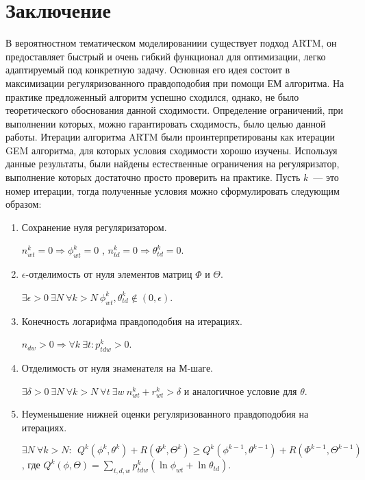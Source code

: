 \documentclass[12pt, twoside]{article}
\begin{document}
\section{Заключение}
	В вероятностном тематическом моделированиии существует подход ARTM, он предоставляет быстрый и очень гибкий функционал для оптимизации, легко адаптируемый под конкретную задачу. Основная его идея состоит в максимизации регуляризованного правдоподобия при помощи ЕМ алгоритма. На практике предложенный алгоритм успешно сходился, однако, не было теоретического обоснования данной сходимости. Определение ограничений, при выполнении которых, можно гарантировать сходимость, было целью данной работы. Итерации алгоритма ARTM были проинтерпретированы как итерации GEM алгоритма, для которых условия сходимости хорошо изучены. Используя данные результаты, были найдены естественные ограничения на регуляризатор, выполнение которых достаточно просто проверить на практике. Пусть $k$~--- это номер итерации, тогда полученные условия можно сформулировать следующим образом:
\begin{enumerate}
\item Сохранение нуля регуляризатором.
\smallskip

$ n^k_{wt} = 0 \Rightarrow \phi^k_{wt} = 0$ , $n^k_{td} = 0 \Rightarrow \theta^k_{td} = 0$.
\item $\epsilon$-отделимость от нуля элементов матриц $\Phi$ и $\Theta$.
\smallskip

$\exists \epsilon>0\ \exists N\ \forall k > N\ \phi^k_{wt}, \theta^k_{td} \notin (0, \epsilon)$. 
\item  Конечность логарифма правдоподобия на итерациях.
\smallskip

$ n_{dw}>0 \Rightarrow \forall k\ \exists t\colon p^k_{tdw} > 0$.
\item Отделимость от нуля знаменателя на М-шаге.
\smallskip

$\exists \delta >0\ \exists N\ \forall k > N \ \forall t\ \exists w\  n^k_{wt} + r^k_{wt} > \delta$ и аналогичное условие для $\theta$. 
\item Неуменьшение нижней оценки регуляризованного правдоподобия на итерациях.
\smallskip

$\exists N\ \forall k > N\colon\ \ Q^k (\phi^k, \theta^k)+ R(\Phi^k, \Theta^k) \geq Q^k(\phi^{k-1}, \theta^{k-1}) + R(\Phi^{k-1}, \Theta^{k-1})$, где $Q^k(\phi, \Theta) = \sum\limits_{t,d,w} p^k_{tdw} (\ln \phi_{wt} + \ln \theta_{td})$.
\end{enumerate}
\end{document}
